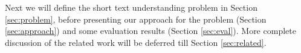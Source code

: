 Next we will define the short text understanding problem in Section
\ref{sec:problem}, before presenting our approach for the problem (Section
\ref{sec:approach}) and some evaluation results (Section \ref{sec:eval}). 
More complete discussion of the related work
will be deferred till Section \ref{sec:related}.

%
%
%
%
%
%
